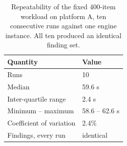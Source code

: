 \begin{table}[htbp]
\centering
\caption{Repeatability of the fixed 400-item workload on platform A, ten consecutive runs against one engine instance. All ten produced an identical finding set.}
\label{tab:repeatability}
\footnotesize
\begin{tabular}{l l}
\hline
Quantity & Value \\
\hline
Runs & 10 \\
Median & 59.6 s \\
Inter-quartile range & 2.4 s \\
Minimum -- maximum & 58.6 -- 62.6 s \\
Coefficient of variation & 2.4\% \\
Findings, every run & identical \\
\hline
\end{tabular}
\end{table}
